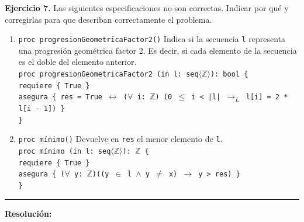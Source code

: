 \hypertarget{ej7}{}
\noindent \textbf{Ejercicio 7.} Las siguientes especificaciones no son correctas. Indicar por qué y corregirlas para que describan correctamente el problema.

\begin{enumerate}[label=\alph*)]
    \item \texttt{proc progresionGeometricaFactor2()} Indica si la secuencia \texttt{l} representa una progresión geométrica factor 2. Es decir, si cada elemento de la secuencia es el doble del elemento anterior. \\
    \texttt{proc progresionGeometricaFactor2 (in l: seq$\langle\mathbb{Z}\rangle$): bool \{} \\
    \texttt{\hspace*{0.5cm}requiere \{ True \}} \\
    \texttt{\hspace*{0.5cm}asegura \{ res = True $\leftrightarrow$ ($\forall$ i: $\mathbb{Z}$) (0 $\leq$ i < |l| $\rightarrow_L$ l[i] = 2 * l[i - 1]) \}} \\
    \texttt{\}}

    \vspace{0.4cm}
    \item \texttt{proc mínimo()} Devuelve en \texttt{res} el menor elemento de \texttt{l}. \\
    \texttt{proc mínimo (in l: seq$\langle\mathbb{Z}\rangle$): $\mathbb{Z}$ \{} \\
    \texttt{\hspace*{0.5cm}requiere \{ True \}} \\
    \texttt{\hspace*{0.5cm}asegura \{ ($\forall$ y: $\mathbb{Z}$)((y $\in$ l $\wedge$ y $\neq$ x) $\rightarrow$ y > res) \}} \\
    \texttt{\}}
\end{enumerate}

\vspace{0.2cm}
{\color{gray}\hrule}
\vspace{0.4cm}

\textbf{Resolución:}

